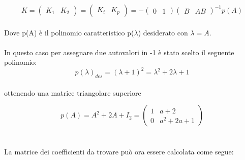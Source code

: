 \documentclass[a4paper,13pt]{article}
\begin{document}
\begin{equation*}                    %
	K=
\begin{pmatrix}

	K_{1}&K_{2}

\end{pmatrix} =						%
\begin{pmatrix}

	K_{i}&K_{p}						

\end{pmatrix} = -					%
\begin{pmatrix}

	0&1						

\end{pmatrix}
\begin{pmatrix}

	B&AB					

\end{pmatrix}^{-1}p(A)
\end{equation*} \\

		Dove p(A) è il polinomio caratteristico p($\lambda$) desiderato con $\lambda=A$.\\\\
	In questo caso per assegnare due autovalori in -1 è stato scelto il seguente polinomio:\\

\begin{equation*}
	p(\lambda)_{des}=(\lambda+1)^{2}=\lambda^{2}+2\lambda+1        %
\end{equation*} \\
	
	ottenendo una matrice triangolare superiore
	
\begin{equation*}
	p(A)=A^{2}+2A+I_{2}=
\begin{pmatrix}

	1&a+2\\0&a^{2}+2a+1

\end{pmatrix}
\end{equation*} \\ \\

	La matrice dei coefficienti da trovare può ora essere calcolata come segue:
\end{document}
